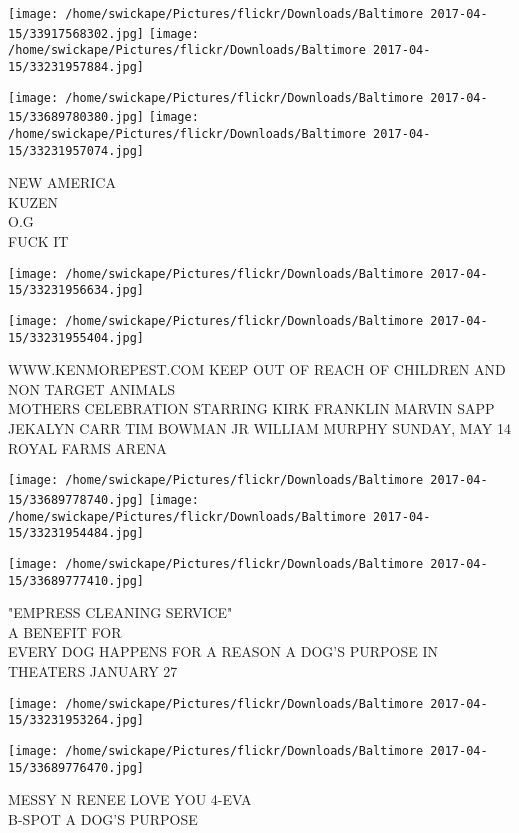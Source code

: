 \documentclass[10pt,letterpaper]{article}
\begin{document}
\texttt{[image: /home/swickape/Pictures/flickr/Downloads/Baltimore 2017-04-15/33917568302.jpg]}
\texttt{[image: /home/swickape/Pictures/flickr/Downloads/Baltimore 2017-04-15/33231957884.jpg]}

\texttt{[image: /home/swickape/Pictures/flickr/Downloads/Baltimore 2017-04-15/33689780380.jpg]}
\texttt{[image: /home/swickape/Pictures/flickr/Downloads/Baltimore 2017-04-15/33231957074.jpg]}

NEW AMERICA\\
KUZEN\\
O.G\\
FUCK IT\\
\pagebreak

\texttt{[image: /home/swickape/Pictures/flickr/Downloads/Baltimore 2017-04-15/33231956634.jpg]}

\vspace{0.25in}
\texttt{[image: /home/swickape/Pictures/flickr/Downloads/Baltimore 2017-04-15/33231955404.jpg]}

WWW.KENMOREPEST.COM KEEP OUT OF REACH OF CHILDREN AND NON TARGET ANIMALS\\
MOTHERS CELEBRATION STARRING KIRK FRANKLIN MARVIN SAPP JEKALYN CARR TIM BOWMAN JR WILLIAM MURPHY SUNDAY, MAY 14 ROYAL FARMS ARENA\\
\pagebreak

\texttt{[image: /home/swickape/Pictures/flickr/Downloads/Baltimore 2017-04-15/33689778740.jpg]}
\texttt{[image: /home/swickape/Pictures/flickr/Downloads/Baltimore 2017-04-15/33231954484.jpg]}

\texttt{[image: /home/swickape/Pictures/flickr/Downloads/Baltimore 2017-04-15/33689777410.jpg]}

"EMPRESS CLEANING SERVICE"\\
A BENEFIT FOR\\
EVERY DOG HAPPENS FOR A REASON A DOG'S PURPOSE IN THEATERS JANUARY 27\\
\pagebreak

\texttt{[image: /home/swickape/Pictures/flickr/Downloads/Baltimore 2017-04-15/33231953264.jpg]}

\vspace{0.25in}
\texttt{[image: /home/swickape/Pictures/flickr/Downloads/Baltimore 2017-04-15/33689776470.jpg]}

MESSY N RENEE LOVE YOU 4{-}EVA\\
B{-}SPOT A DOG'S PURPOSE\\
\pagebreak
\end{document}
